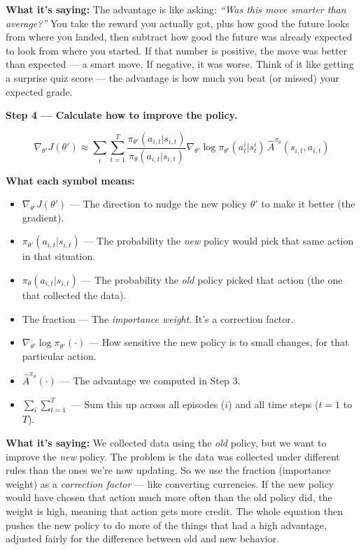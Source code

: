 \textbf{What it's saying:} The advantage is like asking: \textit{``Was this move smarter than average?''} You take the reward you actually got, plus how good the future looks from where you landed, then subtract how good the future was already expected to look from where you started. If that number is positive, the move was better than expected --- a smart move. If negative, it was worse. Think of it like getting a surprise quiz score --- the advantage is how much you beat (or missed) your expected grade.

\bigskip

\textbf{Step 4 --- Calculate how to improve the policy.}

\[
\nabla_{\theta'} J(\theta') \approx \sum_i \sum_{t=1}^{T}
\frac{\pi_{\theta'}(a_{i,t}|s_{i,t})}{\pi_\theta(a_{i,t}|s_{i,t})}
\nabla_{\theta'} \log \pi_{\theta'}(a^i_t|s^i_t)\,
\hat{A}^{\pi_\theta}(s_{i,t}, a_{i,t})
\]

\textbf{What each symbol means:}
\begin{itemize}
    \item $\nabla_{\theta'} J(\theta')$ --- The direction to nudge the new policy $\theta'$ to make it better (the gradient).
    \item $\pi_{\theta'}(a_{i,t}|s_{i,t})$ --- The probability the \textit{new} policy would pick that same action in that situation.
    \item $\pi_\theta(a_{i,t}|s_{i,t})$ --- The probability the \textit{old} policy picked that action (the one that collected the data).
    \item The fraction --- The \textit{importance weight}. It's a correction factor.
    \item $\nabla_{\theta'} \log \pi_{\theta'}(\cdot)$ --- How sensitive the new policy is to small changes, for that particular action.
    \item $\hat{A}^{\pi_\theta}(\cdot)$ --- The advantage we computed in Step 3.
    \item $\sum_i \sum_{t=1}^{T}$ --- Sum this up across all episodes ($i$) and all time steps ($t = 1$ to $T$).
\end{itemize}

\textbf{What it's saying:} We collected data using the \textit{old} policy, but we want to improve the \textit{new} policy. The problem is the data was collected under different rules than the ones we're now updating. So we use the fraction (importance weight) as a \textit{correction factor} --- like converting currencies. If the new policy would have chosen that action much more often than the old policy did, the weight is high, meaning that action gets more credit. The whole equation then pushes the new policy to do more of the things that had a high advantage, adjusted fairly for the difference between old and new behavior.

